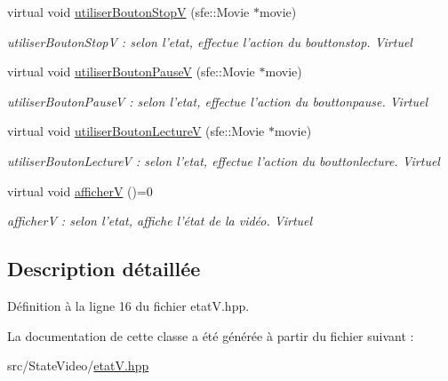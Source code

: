 \begin{DoxyCompactItemize}
\item 
\hypertarget{classEtatV_a28e8ff6a373f24518126adc084b80c65}{virtual void \hyperlink{classEtatV_a28e8ff6a373f24518126adc084b80c65}{utiliser\+Bouton\+Stop\+V} (sfe\+::\+Movie $\ast$movie)}\label{classEtatV_a28e8ff6a373f24518126adc084b80c65}

\begin{DoxyCompactList}\small\item\em utiliser\+Bouton\+Stop\+V \+: selon l'etat, effectue l'action du bouttonstop. Virtuel \end{DoxyCompactList}\item 
\hypertarget{classEtatV_a67aae8fba28db1225b49632e8c96ffcf}{virtual void \hyperlink{classEtatV_a67aae8fba28db1225b49632e8c96ffcf}{utiliser\+Bouton\+Pause\+V} (sfe\+::\+Movie $\ast$movie)}\label{classEtatV_a67aae8fba28db1225b49632e8c96ffcf}

\begin{DoxyCompactList}\small\item\em utiliser\+Bouton\+Pause\+V \+: selon l'etat, effectue l'action du bouttonpause. Virtuel \end{DoxyCompactList}\item 
\hypertarget{classEtatV_ad61eb5d733cf53024cdaa3c58d144752}{virtual void \hyperlink{classEtatV_ad61eb5d733cf53024cdaa3c58d144752}{utiliser\+Bouton\+Lecture\+V} (sfe\+::\+Movie $\ast$movie)}\label{classEtatV_ad61eb5d733cf53024cdaa3c58d144752}

\begin{DoxyCompactList}\small\item\em utiliser\+Bouton\+Lecture\+V \+: selon l'etat, effectue l'action du bouttonlecture. Virtuel \end{DoxyCompactList}\item 
\hypertarget{classEtatV_a25a68ea32060eb91e0a87624d594105c}{virtual void \hyperlink{classEtatV_a25a68ea32060eb91e0a87624d594105c}{afficher\+V} ()=0}\label{classEtatV_a25a68ea32060eb91e0a87624d594105c}

\begin{DoxyCompactList}\small\item\em afficher\+V \+: selon l'etat, affiche l'état de la vidéo. Virtuel \end{DoxyCompactList}\end{DoxyCompactItemize}


\subsection{Description détaillée}


Définition à la ligne 16 du fichier etat\+V.\+hpp.



La documentation de cette classe a été générée à partir du fichier suivant \+:\begin{DoxyCompactItemize}
\item 
src/\+State\+Video/\hyperlink{etatV_8hpp}{etat\+V.\+hpp}\end{DoxyCompactItemize}
